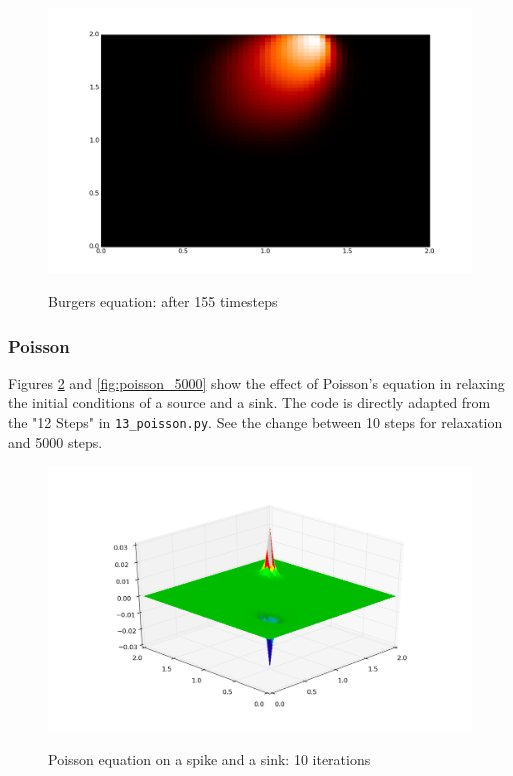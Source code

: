 \documentclass[11pt]{article}
\begin{document}
{	\begin{figure}[H]
	\centering
	\caption{Burgers equation: after 155 timesteps}
	\includegraphics[scale=0.45]{burger_final.png}
	\label{fig:burger_final}
	\end{figure}

\subsubsection{Poisson}
Figures \ref{fig:poisson_10} and \ref{fig:poisson_5000} show the effect of Poisson's
equation in relaxing the initial conditions of a source and a sink. The code is directly
adapted from the "12 Steps" in \texttt{13\_poisson.py}. See the change between 10 steps
for relaxation and 5000 steps.

	\begin{figure}[H]
	\centering
	\caption{Poisson equation on a spike and a sink: 10 iterations}
	\includegraphics[scale=0.7]{poisson_10.png}
	\label{fig:poisson_10}
	\end{figure}
	
}
\end{document}

